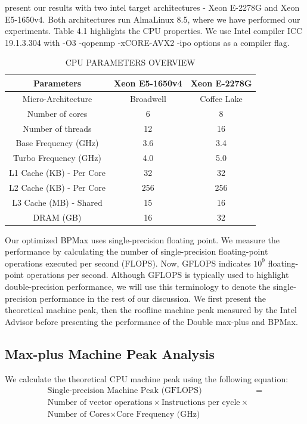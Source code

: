  present our results with two intel target architectures - Xeon E-2278G and Xeon E5-1650v4. Both architectures run AlmaLinux 8.5, where we have performed our experiments. Table 4.1 highlights the CPU properties. We use Intel compiler ICC 19.1.3.304 with -O3  -qopenmp -xCORE-AVX2 -ipo options as a compiler flag.

\begin{table}[htbp]
\caption{\uppercase{CPU Parameters Overview}}
\label{tab:cpu parameters}
\begin{center}
\begin{tabular}{|c||c|c|}
\hline
 Parameters & Xeon E5-1650v4  & Xeon E-2278G \\
\hline
\hline
Micro-Architecture & Broadwell  & Coffee Lake \\
\hline
Number of cores & 6 & 8  \\
Number of threads & 12 & 16  \\
\hline
Base Frequency (GHz) & 3.6  & 3.4  \\
Turbo Frequency (GHz) & 4.0 & 5.0   \\
\hline
L1 Cache (KB) - Per Core  & 32 & 32  \\
L2 Cache (KB) - Per Core &  256  & 256 \\
L3 Cache (MB) - Shared & 15 & 16 \\
DRAM (GB) & 16 & 32 \\
\hline
\end{tabular}
\end{center}
\end{table}


Our optimized BPMax uses single-precision floating point. We measure the performance by calculating the number of single-precision floating-point operations executed per second (FLOPS). Now, GFLOPS indicates $10^9$ floating-point operations per second. Although GFLOPS is typically used to highlight double-precision performance, we will use this terminology to denote the single-precision performance in the rest of our discussion. We first present the theoretical machine peak, then the roofline machine peak measured by the Intel Advisor before presenting the performance of the Double max-plus and BPMax.

\subsection{Max-plus Machine Peak Analysis}
We calculate the theoretical CPU machine peak using the following equation:
\begin{equation}\label{eqn:machine_peak_eqn}
\begin{split}
\text{Single-precision Machine Peak (GFLOPS)} &= \\
\text{Number of vector operations} \times \text {Instructions per cycle} \times \\
\text{Number of Cores} \times \text{Core Frequency (GHz)} \\
\end{split}
\end{equation}


